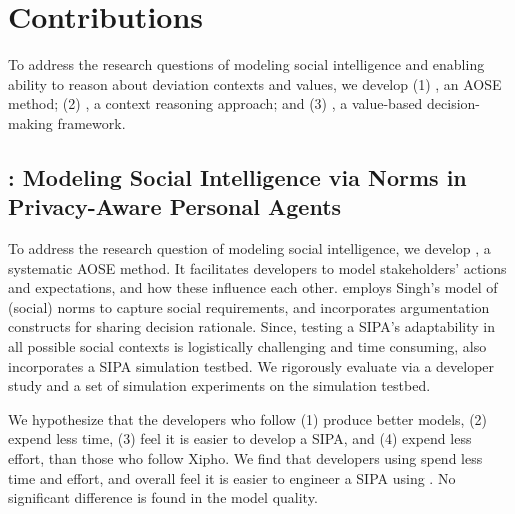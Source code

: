\section{Contributions}
\label{sec:intro-contributions}

To address the research questions of modeling social intelligence and
enabling ability to reason about deviation contexts and values, we
develop (1) \frameworkA, an AOSE method; (2) \frameworkB, a context
reasoning approach; and (3) \frameworkAinur, a value-based decision-making framework.

\subsection[Modeling Social Intelligence via Norms]{\frameworkA: Modeling Social Intelligence via Norms in Privacy-Aware Personal Agents}

To address the research question of modeling social intelligence, we
develop \frameworkA \citep{Ajmeri-AAMAS17-Arnor}, a systematic 
AOSE method. It facilitates developers to model stakeholders' actions
and expectations, and how these influence each other. \frameworkA
employs Singh's  model of (social) norms to
capture social requirements, and incorporates argumentation constructs
\citep{BenchCapon-2007-Argumentation+AI} for sharing decision rationale.
Since, testing a SIPA's adaptability in all possible social contexts is
logistically challenging and time consuming, \frameworkA also
incorporates a SIPA simulation testbed. We rigorously evaluate
\frameworkA via a developer study and a set of simulation experiments on
the simulation testbed. 


We hypothesize that the developers who follow \frameworkA (1) produce
better models, (2) expend less time, (3) feel it is easier to develop a
SIPA, and (4) expend less effort, than those who follow Xipho. We find
that developers using \frameworkA spend less time and effort, and
overall feel it is easier to engineer a SIPA using \frameworkA. No
significant difference is found in the model quality.

